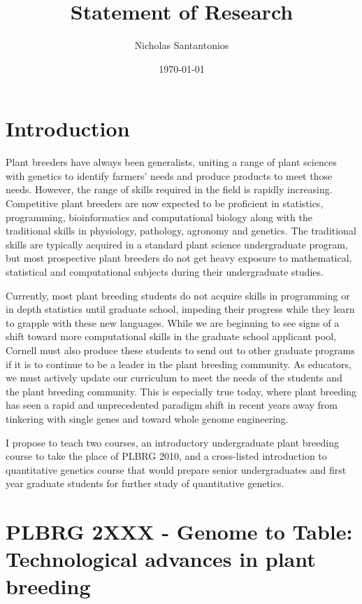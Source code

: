 \documentclass[10pt]{article}
\title{Statement of Research}
\author{Nicholas Santantonios}
\date{\today}
\begin{document}
\section*{Introduction}

Plant breeders have always been generalists, uniting a range of plant sciences with genetics to identify farmers' needs and produce products to meet those needs. However, the range of skills required in the field is rapidly increasing. Competitive plant breeders are now expected to be proficient in statistics, programming, bioinformatics and computational biology along with the traditional skills in physiology, pathology, agronomy and genetics. The traditional skills are typically acquired in a standard plant science undergraduate program, but most prospective plant breeders do not get heavy exposure to  mathematical, statistical and computational subjects during their undergraduate studies. 

Currently, most plant breeding students do not acquire skills in programming or in depth statistics until graduate school, impeding their progress while they learn to grapple with these new languages. While we are beginning to see signs of a shift toward more computational skills in the graduate school applicant pool, Cornell must also produce these students to send out to other graduate programs if it is to continue to be a leader in the plant breeding community. As educators, we must actively update our curriculum to meet the needs of the students and the plant breeding community. This is especially true today, where plant breeding has seen a rapid and unprecedented paradigm shift in recent years away from tinkering with single genes and toward whole genome engineering.


I propose to teach two courses, an introductory undergraduate plant breeding course to take the place of PLBRG 2010, and a cross-listed introduction to quantitative genetics course that would prepare senior undergraduates and first year graduate students for further study of quantitative genetics. 

\section*{PLBRG 2XXX - Genome to Table: Technological advances in plant breeding}
\end{document}
